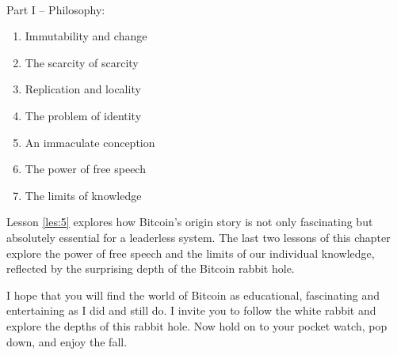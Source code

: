 ~

Part I -- Philosophy:

\begin{enumerate}
  \item Immutability and change
  \item The scarcity of scarcity
  \item Replication and locality
  \item The problem of identity
  \item An immaculate conception
  \item The power of free speech
  \item The limits of knowledge
\end{enumerate}

Lesson \ref{les:5} explores how Bitcoin's origin story is not only fascinating but
absolutely essential for a leaderless system. The last two lessons of this
chapter explore the power of free speech and the limits of our individual
knowledge, reflected by the surprising depth of the Bitcoin rabbit hole.

I hope that you will find the world of Bitcoin as educational, fascinating and
entertaining as I did and still do. I invite you to follow the white rabbit and
explore the depths of this rabbit hole. Now hold on to your pocket watch, pop
down, and enjoy the fall.
